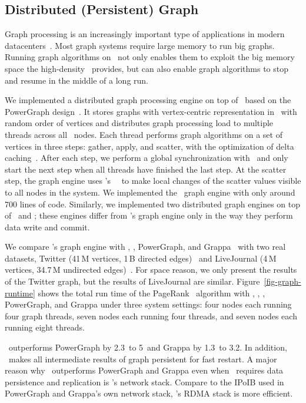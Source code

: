 \subsection{Distributed (Persistent) Graph}
Graph processing is an increasingly important type of applications in modern 
datacenters~\cite{Gonzalez12-OSDI,Gonzalez14-OSDI,Kyrola12-OSDI,Low10-UAI,Low12-VLDB,Malewicz10-SIGMOD}.
Most graph systems require large memory to run big graphs.
Running graph algorithms on \nvm\ not only enables them to exploit the big memory space the high-density \nvm\ provides,
but can also enable graph algorithms to stop and resume in the middle of a long run.

We implemented a distributed graph processing engine on top of \hotpot\ based on the PowerGraph design~\cite{Gonzalez12-OSDI}.
It stores graphs with vertex-centric representation in \dsnvm\ with random order of vertices
and distributes graph processing load to multiple threads across all \hotpot\ nodes.
Each thread performs graph algorithms on a set of vertices in three steps: gather, apply, and scatter, 
with the optimization of delta caching~\cite{Gonzalez12-OSDI}.
After each step, we perform a global synchronization with \barrier\ and only start the next step when all threads have finished the last step.
At the scatter step, the graph engine uses \hotpot's \mrsw\ \commitxact\ to make local changes of the scatter values 
visible to all nodes in the system. We implemented the \hotpot\ graph engine with only around 700 lines of code.
Similarly, we implemented two distributed graph engines on top of \dsmxact\ and \dsmnoxact;
these engines differ from \hotpot's graph engine only in the way they perform data write and commit.

We compare \hotpot's graph engine with \dsmxact, \dsmnoxact, PowerGraph, and Grappa~\cite{Nelson15-ATC} with two real datasets,
Twitter (41\,M vertices, 1\,B directed edges)~\cite{Kwak10-WWW} and LiveJournal (4\,M vertices, 34.7\,M undirected edges)~\cite{snapnets}.
For space reason, we only present the results of the Twitter graph, but the results of LiveJournal are similar.
Figure~\ref{fig-graph-runtime} shows the total run time of the PageRank~\cite{PageRank} algorithm with
\hotpot, \dsmxact, \dsmnoxact, PowerGraph, and Grappa under three system settings:
four nodes each running four graph threads, seven nodes each running four threads, and seven nodes each running eight threads.

\hotpot\ outperforms PowerGraph by 2.3\x\ to 5\x\ and Grappa by 1.3\x\ to 3.2\x.
In addition, \hotpot\ makes all intermediate results of graph persistent for fast restart. 
A major reason why \hotpot\ outperforms PowerGraph and Grappa even when \hotpot\
requires data persistence and replication is \hotpot's network stack.
Compare to the IPoIB used in PowerGraph and Grappa's own network stack,
\hotpot's RDMA stack is more efficient.

